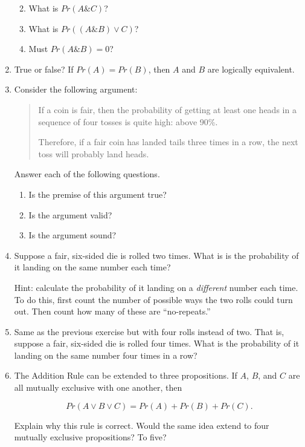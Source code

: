 \documentclass[justified]{tufte-book}
\providecommand{\tightlist}{%
  \setlength{\itemsep}{0pt}\setlength{\parskip}{0pt}}
\renewcommand{\wedge}{\mathbin{\&}}
\newcommand{\p}{Pr}
\newenvironment{argument}{\begin{quote}\normalsize}{\end{quote}}
\theoremstyle{definition}
\theoremstyle{definition}
\theoremstyle{definition}
\theoremstyle{remark}
\begin{document}
\begin{enumerate}
  \begin{enumerate}
  \def\labelenumii{\alph{enumii}.}
  \tightlist
  \item
    What is \(\p(A \wedge C)\)?
  \item
    What is \(\p((A \wedge B) \vee C)\)?
  \item
    Must \(\p(A \wedge B) = 0\)?
  \end{enumerate}
\item
  True or false? If \(\p(A)=\p(B)\), then \(A\) and \(B\) are logically equivalent.
\item
  Consider the following argument:

  \begin{argument}
   If a coin is fair, then the probability of getting at least one heads in
   a sequence of four tosses is quite high: above 90\%.

   Therefore, if a fair coin has landed tails three times in a row, the
   next toss will probably land heads.
   \end{argument}

  Answer each of the following questions.

  \begin{enumerate}
  \def\labelenumii{\alph{enumii}.}
  \tightlist
  \item
    Is the premise of this argument true?
  \item
    Is the argument valid?
  \item
    Is the argument sound?
  \end{enumerate}
\item
  Suppose a fair, six-sided die is rolled two times. What is is the probability of it landing on the same number each time?

  Hint: calculate the probability of it landing on a \emph{different} number each time. To do this, first count the number of possible ways the two rolls could turn out. Then count how many of these are ``no-repeats.''
\item
  Same as the previous exercise but with four rolls instead of two. That is, suppose a fair, six-sided die is rolled four times. What is the probability of it landing on the same number four times in a row?
\item
  The Addition Rule can be extended to three propositions. If \(A\), \(B\), and \(C\) are all mutually exclusive with one another, then

  \[ \p(A \vee B \vee C) = \p(A) + \p(B) + \p(C).\]

  Explain why this rule is correct. Would the same idea extend to four mutually exclusive propositions? To five?


\end{enumerate}
\end{document}
